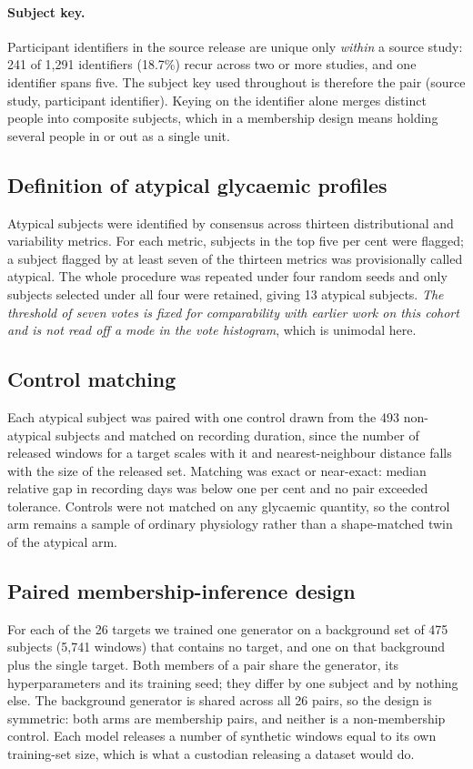 \documentclass[pdflatex,sn-nature]{sn-jnl}
\theoremstyle{thmstyleone}
\begin{document}
\paragraph{Subject key.} Participant identifiers in the source release are unique
only \emph{within} a source study: 241 of 1{,}291 identifiers (18.7\%) recur
across two or more studies, and one identifier spans five. The subject key used
throughout is therefore the pair (source study, participant identifier). Keying
on the identifier alone merges distinct people into composite subjects, which in
a membership design means holding several people in or out as a single unit.

\subsection{Definition of atypical glycaemic profiles}\label{subsec:outliers}
Atypical subjects were identified by consensus across thirteen distributional
and variability metrics. For each metric, subjects in the top five per cent were
flagged; a subject flagged by at least seven of the thirteen metrics was
provisionally called atypical. The whole procedure was repeated under four
random seeds and only subjects selected under all four were retained, giving 13
atypical subjects. \emph{The threshold of seven votes is fixed for comparability
with earlier work on this cohort and is not read off a mode in the vote
histogram}, which is unimodal here.

\subsection{Control matching}\label{subsec:matching}
Each atypical subject was paired with one control drawn from the 493
non-atypical subjects and matched on recording duration, since the number of
released windows for a target scales with it and nearest-neighbour distance
falls with the size of the released set. Matching was exact or near-exact:
median relative gap in recording days was below one per cent and no pair
exceeded tolerance. Controls were not matched on any glycaemic quantity, so the
control arm remains a sample of ordinary physiology rather than a
shape-matched twin of the atypical arm.

\subsection{Paired membership-inference design}\label{subsec:design}
For each of the 26 targets we trained one generator on a background set of 475
subjects (5{,}741 windows) that contains no target, and one on that background
plus the single target. Both members of a pair share the generator, its
hyperparameters and its training seed; they differ by one subject and by nothing
else. The background generator is shared across all 26 pairs, so the design is
symmetric: both arms are membership pairs, and neither is a non-membership
control. Each model releases a number of synthetic windows equal to its own
training-set size, which is what a custodian releasing a dataset would do.
\end{document}
